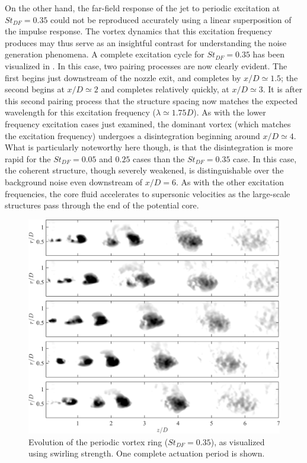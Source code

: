 On the other hand, the far-field response of the jet to periodic excitation at $St_{DF}=0.35$ could not be reproduced accurately using a linear superposition of the impulse response.
The vortex dynamics that this excitation frequency produces may thus serve as an insightful contrast for understanding the noise generation phenomena.
A complete excitation cycle for $St_{DF}=0.35$ has been visualized in .
In this case, two pairing processes are now clearly evident.
The first begins just downstream of the nozzle exit, and completes by $x/D \simeq 1.5$; the second begins at $x/D \simeq 2$ and completes relatively quickly, at $x/D \simeq 3$.
It is after this second pairing process that the structure spacing now matches the expected wavelength for this excitation frequency ($\lambda \simeq 1.75D$).
As with the lower frequency excitation cases just examined, the dominant vortex (which matches the excitation frequency) undergoes a disintegration beginning around $x/D \simeq 4$.
What is particularly noteworthy here though, is that the disintegration is more rapid for the $St_{DF}=0.05$ and $0.25$ cases than the $St_{DF}=0.35$ case.
In this case, the coherent structure, though severely weakened, is distinguishable over the background noise even downstream of $x/D = 6$.
As with the other excitation frequencies, the core fluid accelerates to supersonic velocities as the large-scale structures pass through the end of the potential core.
\begin{figure}
	\centering
	\includegraphics[width=5in]{Figures/ch4_St035_lambda_evolution.png}
	\caption{Evolution of the periodic vortex ring ($St_{DF}=0.35$), as visualized using swirling strength. One complete actuation period is shown.}
	\label{fig:ch4_St035_structure_disintegration}
\end{figure}

